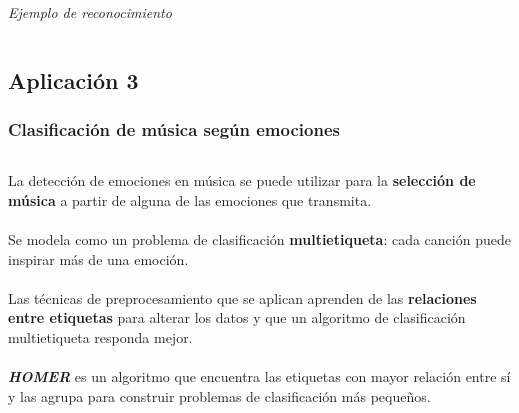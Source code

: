 \documentclass[8pt]{beamer}
\begin{document}
\begin{frame}
\begin{columns}[c]
\begin{column}{.5\textwidth}
\begin{center}
	  \\ \centering \textit{Ejemplo de reconocimiento}
	  \end{center}
       \end{column}
      \end{columns}
    \end{frame}


\subsection{Aplicación 3}
  \begin{frame}
	\frametitle{Clasificación de música según emociones}
	\begin{columns}[c]
		\begin{column}{.5\textwidth}
			La detección de emociones en música se puede utilizar para la 
			\textbf{selección de música} a partir de alguna de las emociones que transmita.
			\\~\\
			Se modela como un problema de clasificación \textbf{multietiqueta}:
			cada canción puede inspirar más de una emoción.
			\\~\\
			Las técnicas de preprocesamiento que se aplican aprenden de las
			\textbf{relaciones entre etiquetas} para alterar los datos y que
			un algoritmo de clasificación multietiqueta responda mejor.
			\\~\\
			\textbf{\textit{HOMER}} es un algoritmo que encuentra las etiquetas con mayor
			relación entre sí y las agrupa para construir problemas de clasificación
			más pequeños.
			

\end{column}
\end{columns}
\end{frame}
\end{document}
